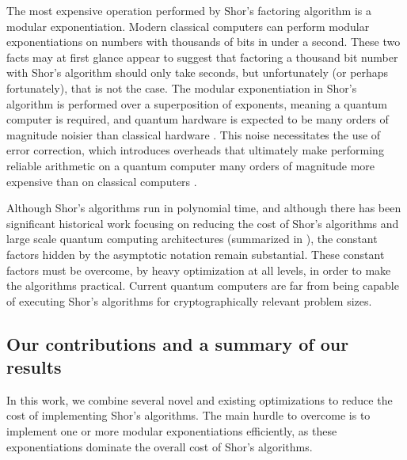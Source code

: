 \documentclass[superscriptaddress,notitlepage,longbibliography]{revtex4-1}
\theoremstyle{definition}
\theoremstyle{definition}
\begin{document}
The most expensive operation performed by Shor's factoring algorithm is a modular exponentiation.
Modern classical computers can perform modular exponentiations on numbers with thousands of bits in under a second.
These two facts may at first glance appear to suggest that factoring a thousand bit number with Shor's algorithm should only take seconds, but unfortunately (or perhaps fortunately), that is not the case.
The modular exponentiation in Shor's algorithm is performed over a superposition of exponents, meaning a quantum computer is required, and quantum hardware is expected to be many orders of magnitude noisier than classical hardware \cite{schroeder2009dram,Bare13,Kim2014}.
This noise necessitates the use of error correction, which introduces overheads that ultimately make performing reliable arithmetic on a quantum computer many orders of magnitude more expensive than on classical computers \cite{fowler2012surfacecodereview, campbell2018constraintsatisfaction}.

Although Shor's algorithms run in polynomial time, and although there has been significant historical work focusing on reducing the cost of Shor's algorithms and large scale quantum computing architectures \cite{vedral1996arithmetic,beckman1996efficient,cleve2000fast,oskin2002practical,copsey2003toward,bravyi2005distillation,whitney2009fault,van2010distributed,jones2012layered,pavlidis2012fast,fowler2012time,fowler2012surfacecodereview,horsman2012latticesurgery,fowler2018,ekeraa2016modifying} (summarized in \cite{vanquantumcomputerarchitecture}), the constant factors hidden by the asymptotic notation remain substantial.
These constant factors must be overcome, by heavy optimization at all levels, in order to make the algorithms practical.
Current quantum computers are far from being capable of executing Shor's algorithms for cryptographically relevant problem sizes.

\subsection{Our contributions and a summary of our results}

In this work, we combine several novel and existing optimizations to reduce the cost of implementing Shor's algorithms.
The main hurdle to overcome is to implement one or more modular exponentiations efficiently, as these exponentiations dominate the overall cost of Shor's algorithms.
\end{document}
